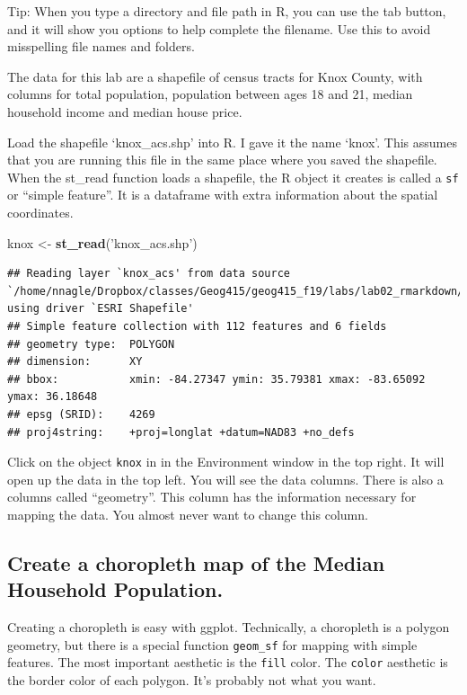 \documentclass[]{article}
\newenvironment{Shaded}{\begin{snugshade}}{\end{snugshade}}
\newcommand{\KeywordTok}[1]{\textcolor[rgb]{0.13,0.29,0.53}{\textbf{#1}}}
\newcommand{\NormalTok}[1]{#1}
\newcommand{\StringTok}[1]{\textcolor[rgb]{0.31,0.60,0.02}{#1}}
\begin{document}
Tip: When you type a directory and file path in R, you can use the tab
button, and it will show you options to help complete the filename. Use
this to avoid misspelling file names and folders.

The data for this lab are a shapefile of census tracts for Knox County,
with columns for total population, population between ages 18 and 21,
median household income and median house price.

Load the shapefile `knox\_acs.shp' into R. I gave it the name `knox'.
This assumes that you are running this file in the same place where you
saved the shapefile. When the st\_read function loads a shapefile, the R
object it creates is called a \texttt{sf} or ``simple feature''. It is a
dataframe with extra information about the spatial coordinates.

\begin{Shaded}
\begin{Highlighting}[]
\NormalTok{knox <-}\StringTok{ }\KeywordTok{st_read}\NormalTok{(}\StringTok{'knox_acs.shp'}\NormalTok{)}
\end{Highlighting}
\end{Shaded}

\begin{verbatim}
## Reading layer `knox_acs' from data source `/home/nnagle/Dropbox/classes/Geog415/geog415_f19/labs/lab02_rmarkdown/knox_acs.shp' using driver `ESRI Shapefile'
## Simple feature collection with 112 features and 6 fields
## geometry type:  POLYGON
## dimension:      XY
## bbox:           xmin: -84.27347 ymin: 35.79381 xmax: -83.65092 ymax: 36.18648
## epsg (SRID):    4269
## proj4string:    +proj=longlat +datum=NAD83 +no_defs
\end{verbatim}

Click on the object \texttt{knox} in in the Environment window in the
top right. It will open up the data in the top left. You will see the
data columns. There is also a columns called ``geometry''. This column
has the information necessary for mapping the data. You almost never
want to change this column.

\hypertarget{create-a-choropleth-map-of-the-median-household-population.}{%
\subsection{Create a choropleth map of the Median Household
Population.}\label{create-a-choropleth-map-of-the-median-household-population.}}

Creating a choropleth is easy with ggplot. Technically, a choropleth is
a polygon geometry, but there is a special function \texttt{geom\_sf}
for mapping with simple features. The most important aesthetic is the
\texttt{fill} color. The \texttt{color} aesthetic is the border color of
each polygon. It's probably not what you want.
\end{document}
